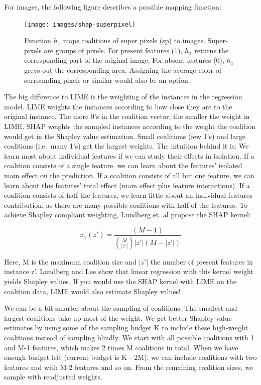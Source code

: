 \documentclass[
  12pt,
]{krantz}
\begin{document}
For images, the following figure describes a possible mapping function:

\begin{figure}

{\centering \texttt{[image: images/shap-superpixel]} 

}

\caption{Function $h_x$ maps coalitions of super pixels (sp) to images. Super-pixels are groups of pixels. For present features (1), $h_x$ returns the corresponding part of the original image. For absent features (0), $h_x$ greys out the corresponding area. Assigning the average color of surrounding pixels or similar would also be an option.}\label{fig:unnamed-chunk-43}
\end{figure}

The big difference to LIME is the weighting of the instances in the regression model.
LIME weights the instances according to how close they are to the original instance.
The more 0's in the coalition vector, the smaller the weight in LIME.
SHAP weights the sampled instances according to the weight the coalition would get in the Shapley value estimation.
Small coalitions (few 1's) and large coalitions (i.e.~many 1's) get the largest weights.
The intuition behind it is:
We learn most about individual features if we can study their effects in isolation.
If a coalition consists of a single feature, we can learn about the features' isolated main effect on the prediction.
If a coalition consists of all but one feature, we can learn about this features' total effect (main effect plus feature interactions).
If a coalition consists of half the features, we learn little about an individual features contribution, as there are many possible coalitions with half of the features.
To achieve Shapley compliant weighting, Lundberg et. al propose the SHAP kernel:

\[\pi_{x}(z')=\frac{(M-1)}{\binom{M}{|z'|}|z'|(M-|z'|)}\]

Here, M is the maximum coalition size and \(|z'|\) the number of present features in instance z'.
Lundberg and Lee show that linear regression with this kernel weight yields Shapley values.
If you would use the SHAP kernel with LIME on the coalition data, LIME would also estimate Shapley values!

We can be a bit smarter about the sampling of coalitions:
The smallest and largest coalitions take up most of the weight.
We get better Shapley value estimates by using some of the sampling budget K to include these high-weight coalitions instead of sampling blindly.
We start with all possible coalitions with 1 and M-1 features, which makes 2 times M coalitions in total.
When we have enough budget left (current budget is K - 2M), we can include coalitions with two features and with M-2 features and so on.
From the remaining coalition sizes, we sample with readjusted weights.
\end{document}
